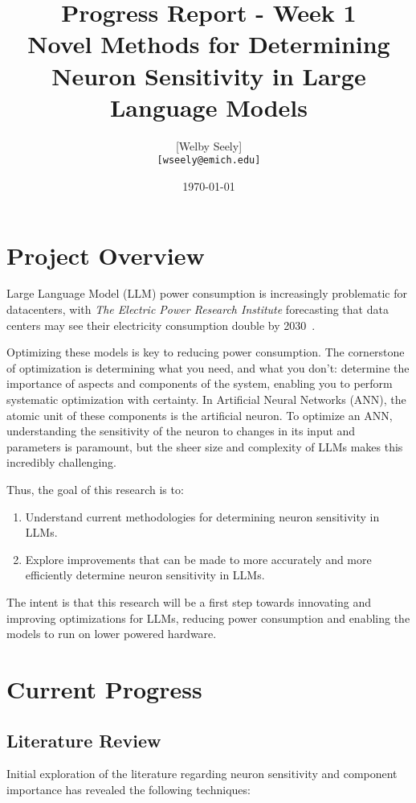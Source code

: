 \documentclass{article}
\title{Progress Report - Week 1 \\
\large Novel Methods for Determining Neuron Sensitivity in Large Language Models}
\author{
    [Welby Seely] \\
    \texttt{[wseely@emich.edu]}
}
\date{\today}
\begin{document}
    \maketitle

    \section*{Project Overview}
    Large Language Model (LLM) power consumption is increasingly problematic for datacenters, with \textit{The Electric Power
    Research Institute} forecasting that data centers may see their electricity consumption double by
    2030~\cite{kindig2024}.

    Optimizing these models is key to reducing power consumption.
    The cornerstone of optimization is determining what you need, and what you don't: determine the importance of
    aspects and components of the system, enabling you to perform systematic optimization with certainty.
    In Artificial Neural Networks (ANN), the atomic unit of these components is the artificial neuron.
    To optimize an ANN, understanding the sensitivity of the neuron to changes in its input and parameters is paramount,
    but the sheer size and complexity of LLMs makes this incredibly challenging.

    Thus, the goal of this research is to:
    \begin{enumerate}
        \item Understand current methodologies for determining neuron sensitivity in LLMs.
        \item Explore improvements that can be made to more accurately and more efficiently determine neuron sensitivity in
        LLMs.
    \end{enumerate}

    The intent is that this research will be a first step towards innovating and improving optimizations for LLMs,
    reducing power consumption and enabling the models to run on lower powered hardware.

    \section*{Current Progress}
    \subsection*{Literature Review}
    Initial exploration of the literature regarding neuron sensitivity and component importance has revealed the
    following techniques:
\end{document}
